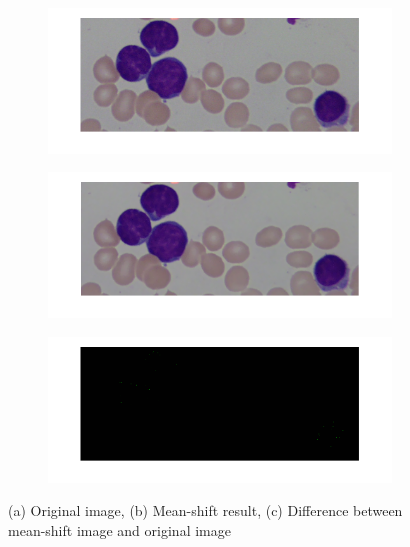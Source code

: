 \begin{figure}
	\centering
	\begin{subfigure}[b]{1\textwidth}
        \includegraphics[width=\textwidth]{img/final/menorig.png}
        \caption{ }
        \label{fig:meanorig}
    \end{subfigure}
    \begin{subfigure}[b]{1\textwidth}
		\includegraphics[width=\textwidth]{img/final/meanshift.png}
		\caption{ }
		\label{fig:meanshift}
	\end{subfigure}
	\begin{subfigure}[b]{1\textwidth}
		\includegraphics[width=\textwidth]{img/final/meanshiftdifferenceimage.png}
		\caption{ }
		\label{fig:meandifference}
	\end{subfigure}
	\caption{(a) Original image, (b) Mean-shift result, (c) Difference between mean-shift image and original image}
	\label{fig:mean}
\end{figure}

